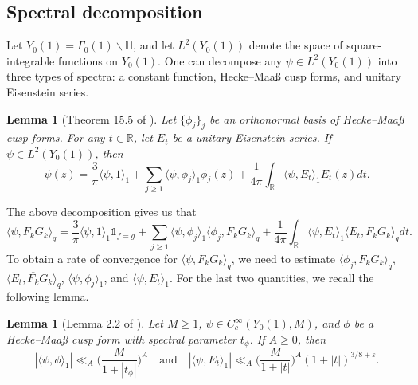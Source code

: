 \documentclass[12pt,reqno]{amsart}
\newtheorem{lem}[thm]{Lemma}
\theoremstyle{remark}
\newcommand{\h}{\mathbb{H}}
\newcommand{\bs}{\backslash}
\numberwithin{equation}{section}
\begin{document}
	\subsection{Spectral decomposition}\label{subsec:spectral-decom}
    Let $Y_0(1) = \Gamma_0(1)\bs\h$,  and let $L^2(Y_0(1))$ denote the space of square-integrable  functions on $Y_0(1)$. One can decompose any $\psi \in L^2(Y_0(1))$ into three types of spectra: a constant function, Hecke--Maa{\ss} cusp forms, and unitary Eisenstein series. 
    
	\begin{lem}[Theorem 15.5 of \cite{IK}] Let $\{\phi_j\}_j$ be an orthonormal basis of Hecke--Maa{\ss} cusp forms. For any $t \in \mathbb{R}$, let $E_t$ be a unitary Eisenstein series.  If $\psi\in L^2(Y_0(1))$, then
		\begin{equation*}
			\psi(z) = \frac{3}{\pi}\langle \psi, 1 \rangle_1 + \sum_{j \ge 1}\langle \psi, \phi_j \rangle_1 \phi_j(z) + \frac{1}{4\pi}\int_{\mathbb{R}} \langle \psi, E_t \rangle_1 E_t(z) dt.
		\end{equation*} 
	\end{lem}
	The above decomposition gives us that
 \begin{equation}\label{eq:spect-decom-2}
		\langle \psi, \overline{F_k}G_k \rangle_q =  \frac{3}{\pi}\langle \psi , 1 \rangle_1 \mathds{1}_{f = g} + \sum_{j \ge 1}\langle \psi, \phi_j \rangle_1 \langle \phi_j, \overline{F_k}G_k \rangle_q + \frac{1}{4\pi}\int_{\mathbb{R}} \langle \psi, E_t \rangle_1 \langle E_t, \overline{F_k}G_k \rangle_q dt.
	\end{equation}
        To obtain a rate of convergence for $\langle \psi, \overline{F_k}G_k \rangle_q$, we need to estimate $\langle \phi_j, \overline{F_k}G_k \rangle_q$, $\langle E_t, \overline{F_k}G_k \rangle_q$, $\langle \psi, \phi_j \rangle_1$, and $\langle \psi, E_t \rangle_1$.  For the last two quantities, we recall the following lemma.

        
	\begin{lem}[Lemma 2.2 of \cite{BH}]\label{lem:petersson-bounds}
		Let $M \ge 1$, $\psi \in C^{\infty}_c(Y_0(1), M)$, and $\phi$ be a Hecke--Maa{\ss} cusp form with spectral parameter $ t_\phi $. If $A\geq 0$, then 
	\[
	       |\langle\psi, \phi\rangle_1| \ll_A \Big(\frac{M}{ 1+|t_\phi| }\Big)^A \quad \text{and} \quad |\langle\psi, E_t\rangle_1| \ll_A \Big(\frac{M}{1+|t|}\Big)^A(1+|t|)^{3/8+\varepsilon}.
	\]
	\end{lem}

        
\end{document}
